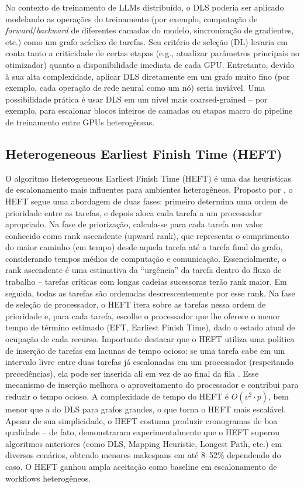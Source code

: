 \documentclass[12pt, %
openright, 
oneside, %
a4paper,    %
brazil]{facom-ufu-abntex2}
\begin{document}
No contexto de treinamento de LLMs distribuído, o DLS poderia ser aplicado modelando as operações do treinamento (por exemplo, computação de \textit{forward}/\textit{backward} de diferentes camadas do modelo, sincronização de gradientes, etc.) como um grafo acíclico de tarefas. Seu critério de seleção (DL) levaria em conta tanto a criticidade de certas etapas (e.g., atualizar parâmetros principais no otimizador) quanto a disponibilidade imediata de cada GPU. Entretanto, devido à sua alta complexidade, aplicar DLS diretamente em um grafo muito fino (por exemplo, cada operação de rede neural como um nó) seria inviável. Uma possibilidade prática é usar DLS em um nível mais coarsed-grained – por exemplo, para escalonar blocos inteiros de camadas ou etapas macro do pipeline de treinamento entre GPUs heterogêneas.

\subsection{Heterogeneous Earliest Finish Time (HEFT)}
O algoritmo Heterogeneous Earliest Finish Time (HEFT)\cite{baskiyar2005scheduling}  é uma das heurísticas de escalonamento mais
influentes para ambientes heterogêneos. Proposto por \cite{topcuoglu2002performance}, o HEFT segue uma
abordagem de duas fases: primeiro determina uma ordem de prioridade entre as tarefas, e depois
aloca cada tarefa a um processador apropriado. Na fase de priorização, calcula-se para cada tarefa um
valor conhecido como rank ascendente (upward rank), que representa o comprimento do maior
caminho (em tempo) desde aquela tarefa até a tarefa final do grafo, considerando tempos médios de computação e comunicação. \cite{sandokji2019communication}  Essencialmente, o rank ascendente é uma estimativa da “urgência” da
tarefa dentro do fluxo de trabalho – tarefas críticas com longas cadeias sucessoras terão rank maior. Em
seguida, todas as tarefas são ordenadas descrescentemente por esse rank.
Na fase de seleção de processador, o HEFT itera sobre as tarefas nessa ordem de prioridade e, para
cada tarefa, escolhe o processador que lhe oferece o menor tempo de término estimado (EFT, Earliest
Finish Time), dado o estado atual de ocupação de cada recurso\cite{baskiyar2005scheduling}.  Importante destacar que o HEFT
utiliza uma política de inserção de tarefas em lacunas de tempo ocioso: se uma tarefa cabe em um
intervalo livre entre duas tarefas já escalonadas em um processador (respeitando precedências), ela
pode ser inserida ali em vez de ao final da fila \cite{sandokji2019communication}. Esse mecanismo de inserção melhora o
aproveitamento do processador e contribui para reduzir o tempo ocioso.
A complexidade de tempo do HEFT é $O(v^2 \cdot p)$\cite{sandokji2019communication},  bem menor que a do DLS para grafos
grandes, o que torna o HEFT mais escalável. Apesar de sua simplicidade, o HEFT costuma produzir
cronogramas de boa qualidade – de fato, \cite{topcuoglu2002performance} demonstraram experimentalmente que o
HEFT superou algoritmos anteriores (como DLS, Mapping Heuristic, Longest Path, etc.) em diversos
cenários, obtendo menores makespans em até 8–52\% dependendo do caso\cite{sandokji2019communication}.  O HEFT ganhou ampla
aceitação como baseline em escalonamento de workflows heterogêneos.
\end{document}
